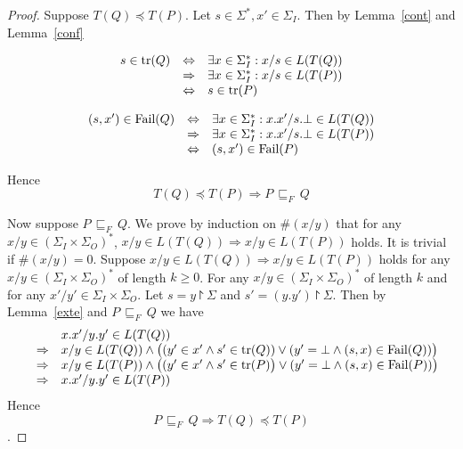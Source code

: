 \begin{proof}
Suppose $T(Q)\preceq  T(P)$. Let $s\in \Sigma^*, x'\in \Sigma_I$. Then by Lemma~\ref{cont} and Lemma~\ref{conf}

\[\begin{array}{lll}
 s\in \text{tr}(Q) &\Leftrightarrow & \exists x\in \Sigma_I^*: x/s\in L(T(Q))\\
&\Rightarrow& \exists x\in \Sigma_I^*:  x/s\in  L(T(P))\\
&\Leftrightarrow &s\in \text{tr}(P)\\
\end{array}
\]

\[\begin{array}{lll}
(s,   x')\in {\text {\rm Fail}}(Q) &\Leftrightarrow & \exists x\in \Sigma_I^*: x.x'/s.\bot \in L(T(Q))\\
&\Rightarrow& \exists x\in \Sigma_I^*: x.x'/s.\bot \in L(T(P))\\
&\Leftrightarrow &(s,   x')\in {\text {\rm Fail}}(P)\\
\end{array}
\]

Hence $$T(Q)\preceq  T(P)\Rightarrow P\,\sqsubseteq_F\, Q$$

Now suppose $P\,\sqsubseteq_F\, Q$. We prove by induction on $\#(x/y)$ that for any $x/y\in (\Sigma_I\times \Sigma_O)^*$,  $x/y\in L(T(Q))\Rightarrow x/y\in L(T(P))$ holds. 
It is trivial if $\#(x/y)=0$. Suppose $x/y\in L(T(Q))\Rightarrow x/y\in L(T(P))$ holds for any $x/y\in (\Sigma_I\times \Sigma_O)^*$ of length $k\ge 0$. 
For any $x/y\in (\Sigma_I\times \Sigma_O)^*$ of length $k$ and for any   $x'/y'\in \Sigma_I\times \Sigma_O$. Let $s=y\project \Sigma$ and $s'=(y.y')\project \Sigma$. Then by Lemma~\ref{exte} and $ P\,\sqsubseteq_F\, Q$ we have 
\[\begin{array}{lll}
&&x.x'/y.y'\in L(T(Q))\\&\Rightarrow& x/y\in L(T(Q))\wedge \big((y'\in x'\wedge s'\in \text{tr}(Q))\vee (y'=\bot\wedge (s, x)\in {\text {\rm Fail}}(Q))\big)\\
&\Rightarrow& x/y\in L(T(P))\wedge \big((y'\in x'\wedge s'\in \text{tr}(P)\big)\vee (y'=\bot\wedge (s, x)\in {\text {\rm Fail}}(P))\big)\\
 &\Rightarrow& x.x'/y.y'\in L(T(P)) \\
\end{array}
\]
Hence $$ P\,\sqsubseteq_F\, Q \Rightarrow T(Q)\preceq  T(P)$$.
\xbox
\end{proof}
 

